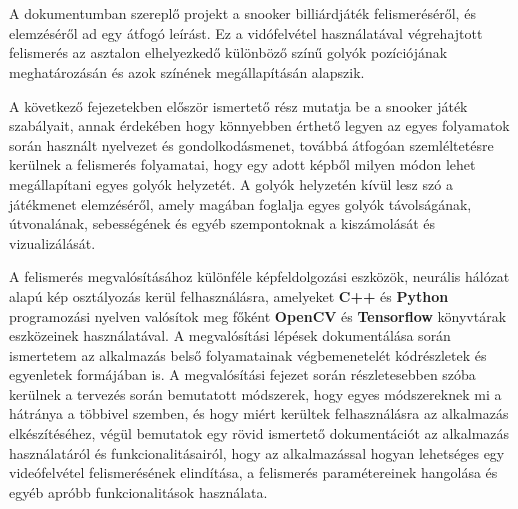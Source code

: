 \chapter{\bevezetes}

A dokumentumban szereplő projekt a snooker billiárdjáték felismeréséről, és elemzéséről ad egy átfogó leírást. Ez a vidófelvétel használatával végrehajtott felismerés az asztalon elhelyezkedő különböző színű golyók pozíciójának meghatározásán és azok színének megállapításán alapszik.
\par A következő fejezetekben először ismertető rész mutatja be a snooker játék szabályait, annak érdekében hogy könnyebben érthető legyen az egyes folyamatok során használt nyelvezet és gondolkodásmenet, továbbá átfogóan szemléltetésre kerülnek a felismerés folyamatai, hogy egy adott képből milyen módon lehet megállapítani egyes golyók helyzetét. A golyók helyzetén kívül lesz szó a játékmenet elemzéséről, amely magában foglalja egyes golyók távolságának, útvonalának, sebességének és egyéb szempontoknak a kiszámolását és vizualizálását.
\par A felismerés megvalósításához különféle képfeldolgozási eszközök, neurális hálózat alapú kép osztályozás kerül felhasználásra, amelyeket \textbf{C++} és \textbf{Python} programozási nyelven valósítok meg főként \textbf{OpenCV} és \textbf{Tensorflow} könyvtárak eszközeinek használatával. A megvalósítási lépések dokumentálása során ismertetem az alkalmazás belső folyamatainak végbemenetelét kódrészletek és egyenletek formájában is. A megvalósítási fejezet során részletesebben szóba kerülnek a tervezés során bemutatott módszerek, hogy egyes módszereknek mi a hátránya a többivel szemben, és hogy miért kerültek felhasználásra az alkalmazás elkészítéséhez, végül bemutatok egy rövid ismertető dokumentációt az alkalmazás használatáról és funkcionalitásairól, hogy az alkalmazással hogyan lehetséges egy videófelvétel felismerésének elindítása, a felismerés paramétereinek hangolása és egyéb apróbb funkcionalitások használata.